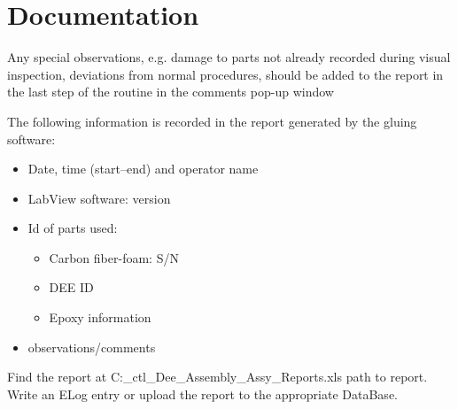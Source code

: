 \documentclass[12pt]{cornelltfpxsop}
\begin{document}
\section{Documentation}

Any special observations, e.g. damage to parts not already recorded during visual inspection, deviations from normal procedures, should be added to the report in the last step of the routine in the comments pop-up window 

The following information is recorded in the report generated by the gluing software:
\begin{itemize}
    \item Date, time (start--end) and operator name
    \item LabView software: version
    \item Id of parts used:
	\begin{itemize}
	    \item Carbon fiber-foam: S/N
	    \item DEE ID
	    \item Epoxy information
	\end{itemize}
    \item observations/comments
\end{itemize}

Find the report at C:\Users{}_ctl\Documents\Final_Dee_Assembly\Dee_Assy_Reports\Report.xls path to report. Write an ELog entry or upload the report to the appropriate DataBase.  
\end{document}
